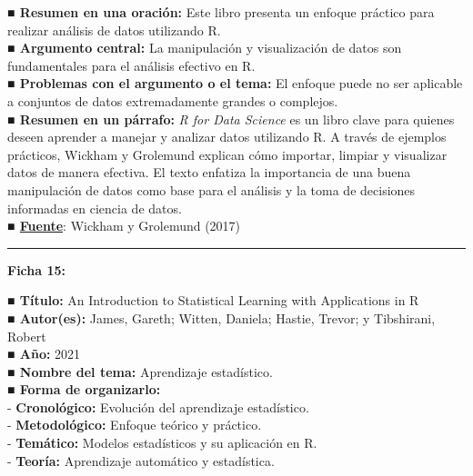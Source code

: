 \documentclass[
  letterpaper,
  DIV=11,
  numbers=noendperiod]{scrreprt}
\begin{document}
\textbf{■ Resumen en una oración:} Este libro presenta un enfoque
práctico para realizar análisis de datos utilizando R.\\
\textbf{■ Argumento central:} La manipulación y visualización de datos
son fundamentales para el análisis efectivo en R.\\
\textbf{■ Problemas con el argumento o el tema:} El enfoque puede no ser
aplicable a conjuntos de datos extremadamente grandes o complejos.\\
\textbf{■ Resumen en un párrafo:} \emph{R for Data Science} es un libro
clave para quienes deseen aprender a manejar y analizar datos utilizando
R. A través de ejemplos prácticos, Wickham y Grolemund explican cómo
importar, limpiar y visualizar datos de manera efectiva. El texto
enfatiza la importancia de una buena manipulación de datos como base
para el análisis y la toma de decisiones informadas en ciencia de
datos.\\
\textbf{■ \href{https://r4ds.had.co.nz}{Fuente}}: Wickham y Grolemund
(2017)

\begin{center}\rule{0.5\linewidth}{0.5pt}\end{center}

\textbf{Ficha 15:}

\textbf{■ Título:} An Introduction to Statistical Learning with
Applications in R\\
\textbf{■ Autor(es):} James, Gareth; Witten, Daniela; Hastie, Trevor; y
Tibshirani, Robert\\
\textbf{■ Año:} 2021\\
\textbf{■ Nombre del tema:} Aprendizaje estadístico.\\
\textbf{■ Forma de organizarlo:}\\
- \textbf{Cronológico:} Evolución del aprendizaje estadístico.\\
- \textbf{Metodológico:} Enfoque teórico y práctico.\\
- \textbf{Temático:} Modelos estadísticos y su aplicación en R.\\
- \textbf{Teoría:} Aprendizaje automático y estadística.
\end{document}

